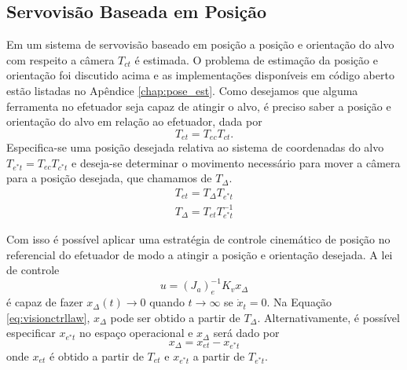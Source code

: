 
\subsection{Servovisão Baseada em Posição}
Em um sistema de servovisão baseado em posição a posição e orientação do alvo com respeito a câmera ${T}_{ct}$ é estimada. O problema de estimação da posição e orientação foi discutido acima e as implementações disponíveis em código aberto estão listadas no Apêndice \ref{chap:pose_est}. Como desejamos que alguma ferramenta no efetuador seja capaz de atingir o alvo, é preciso saber a posição e orientação do alvo em relação ao efetuador, dada por
\begin{equation}
T_{et} = T_{ec} T_{ct}.
\end{equation} 
Especifica-se uma posição desejada relativa ao sistema de coordenadas do alvo  ${T}_{e^*t} = {T}_{ec} T_{c^*t} $ e deseja-se determinar o movimento necessário para mover a câmera para a posição desejada, que chamamos de ${T}_\Delta$.
\begin{align}
 {T}_{et} =  {T}_\Delta {T}_{e^*t} \\
 {T}_\Delta  =   {T}_{et} {T}_{e^*t}^{-1}
\end{align}

Com isso é possível aplicar uma estratégia de controle cinemático de posição no referencial do efetuador de modo a atingir a posição e orientação desejada. A lei de controle
\begin{equation} \label{eq:visionctrllaw}
{u} = ({J}_a)_e^{-1}{K}_v x_\Delta
\end{equation}
é capaz de fazer ${x_\Delta}(t) \rightarrow 0$ quando $t \rightarrow \infty$ se $\dot{{x}}_t = 0$. Na Equação \eqref{eq:visionctrllaw}, $x_\Delta$ pode ser obtido a partir de  ${T}_\Delta$. Alternativamente, é possível especificar ${x}_{e^*t}$ no espaço operacional e $x_\Delta$ será dado por
\begin{equation}
x_\Delta = {x}_{et} - {x}_{e^*t}
\end{equation}
onde ${x}_{et}$ é obtido a partir de $T_{et}$ e ${x}_{e^*t}$ a partir de ${T}_{e^*t}$.



